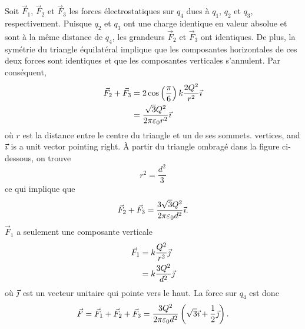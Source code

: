   Soit $\vec{F}_1$, $\vec{F}_2$ et $\vec{F}_3$ les forces électrostatiques sur
  $q_4$ dues à $q_1$, $q_2$ et $q_3$, respectivement. Puisque $q_2$ et $q_3$
  ont une charge identique en valeur absolue et sont à la même distance de
  $q_4$, les grandeurs $\vec{F}_2$ et $\vec{F}_3$ ont identiques. De plus, la
  symétrie du triangle équilatéral implique que les composantes horizontales de
  ces deux forces sont identiques et que les composantes verticales s'annulent.
  Par conséquent,
  \begin{eqnarray*}
    \vec{F}_2 + \vec{F}_3 &= 2 \cos\left( \frac{\pi}{6} \right)k
      \frac{2Q^2}{r^2}\vec{\imath} \\
    &= \frac{\sqrt{3} Q^2}{2\pi\varepsilon_0 r^2} \vec{\imath}
  \end{eqnarray*}
  où $r$ est la distance entre le centre du triangle et un de ses sommets.
  vertices, and $\vec{\imath}$ is a unit vector pointing right. À partir du triangle
  ombragé dans la figure ci-dessous, on trouve
  \begin{equation*}
    r^2 = \frac{d^2}{3}
  \end{equation*}
  ce qui implique que
  \begin{equation*}
    \vec{F}_2 + \vec{F}_3 = \frac{3\sqrt{3} Q^2}{2\pi\varepsilon_0 d^2} \vec{\imath}.
  \end{equation*}
  $\vec{F}_1$ a seulement une composante verticale
  \begin{eqnarray*}
    \vec{F}_1 &= k \frac{Q^2}{r^2} \vec{\jmath} \\
    &= k \frac{3Q^2}{d^2} \vec{\jmath}
  \end{eqnarray*}
  où $\vec{\jmath}$ est un vecteur unitaire qui pointe vers le haut.
  La force sur $q_4$ est donc
  \begin{equation*}
    \vec{F} = \vec{F}_1 + \vec{F}_2 + \vec{F}_3 =
    \frac{3Q^2}{2\pi\varepsilon_0 d^2} \left( \sqrt{3} \vec{\imath} + \frac{1}{2}\vec{\jmath}
    \right).
  \end{equation*}

